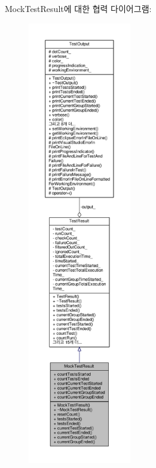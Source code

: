 Mock\+Test\+Result에 대한 협력 다이어그램\+:
\nopagebreak
\begin{figure}[H]
\begin{center}
\leavevmode
\includegraphics[height=550pt]{class_mock_test_result__coll__graph}
\end{center}
\end{figure}
